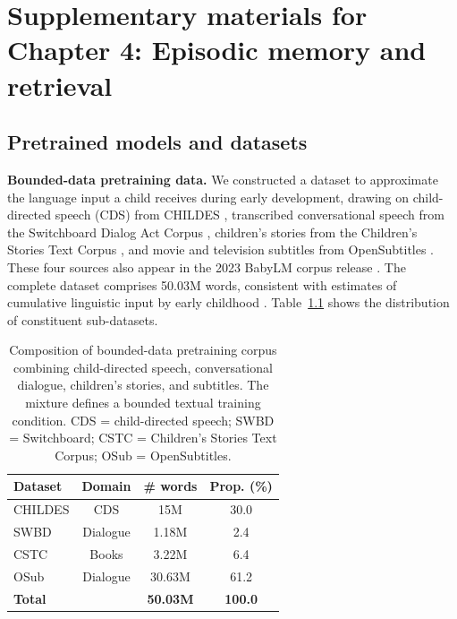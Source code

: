 \chapter[Supplementary materials for Chapter 4]{Supplementary materials for Chapter 4: Episodic memory and retrieval}
\label{app:retrieval}
\begingroup
\graphicspath{{ch4/papers/RAG/}}



\section{Pretrained models and datasets}
\label{app:model_dataset}


\noindent \textbf{Bounded-data pretraining data.} We constructed a dataset to approximate the language input a child receives during early development, drawing on child-directed speech (CDS) from CHILDES \citep{macwhinney2000childes}, transcribed conversational speech from the Switchboard Dialog Act Corpus \citep{godfrey1992switchboard,stolcke_dialogue_2000}, children's stories from the Children's Stories Text Corpus \citep{bensaid2021fairytailor}, and movie and television subtitles from OpenSubtitles \citep{lison2016opensubtitles}. These four sources also appear in the 2023 BabyLM corpus release
\citep{warstadt2023findings}. The complete dataset comprises 50.03M words, consistent with estimates of cumulative linguistic input by early childhood \citep{gilkerson2017mapping,frank2023bridging}. Table~\ref{tab:training_data} shows the distribution of constituent sub-datasets.


\begin{table}[ht]
\centering
\small
\vspace{8pt}
\caption{Composition of bounded-data pretraining corpus combining child-directed
speech, conversational dialogue, children's stories, and subtitles. The mixture defines a bounded textual training condition. CDS = child-directed speech; SWBD = Switchboard; CSTC = Children's Stories Text Corpus; OSub = OpenSubtitles.}
\label{tab:training_data}
\setlength{\tabcolsep}{4pt}
\renewcommand{\arraystretch}{1.1}
\begin{tabular}{lccc}
\toprule
\textbf{Dataset} & \textbf{Domain} & \textbf{\# words} & \textbf{Prop. (\%)} \\
\midrule
CHILDES & CDS      & 15M    & 30.0 \\
SWBD    & Dialogue & 1.18M  & 2.4  \\
CSTC    & Books    & 3.22M  & 6.4  \\
OSub    & Dialogue & 30.63M & 61.2 \\
\midrule
\textbf{Total} & & \textbf{50.03M} & \textbf{100.0} \\
\bottomrule
\end{tabular}
\end{table}




